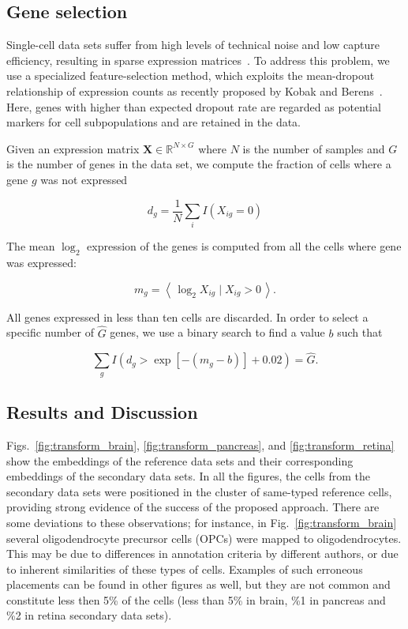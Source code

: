 \documentclass[runningheads]{llncs}
\begin{document}
\subsection{Gene selection\label{sec:gene-selection}}

Single-cell data sets suffer from high levels of technical noise and low
capture efficiency, resulting in sparse expression matrices~\cite{umi}. To
address this problem, we use a specialized feature-selection method, which
exploits the mean-dropout relationship of expression counts as recently
proposed by Kobak and Berens~\cite{art_of_using_tsne}. Here, genes with higher
than expected dropout rate are regarded as potential markers for cell
subpopulations and are retained in the data.

Given an expression matrix $\mathbf{X} \in \mathbb{R}^{N \times G}$ where $N$
is the number of samples and $G$ is the number of genes in the data set, we
compute the fraction of cells where a gene $g$ was not expressed

\begin{equation}
d_g = \frac{1}{N} \sum_i I \left ( X_{ig} = 0\right )
\end{equation}

\noindent The mean $\log_2$ expression of the genes is computed from all the
cells where gene was expressed:

\begin{equation}
m_g = \left \langle \, \log_2 X_{ig} \mid X_{ig} > 0 \, \right \rangle.
\end{equation}

All genes expressed in less than ten cells are discarded. In order to select a
specific number of $\hat{G}$ genes, we use a binary search to find a value $b$
such that

\begin{equation}
\sum_g I \left (d_g > \exp \left [ -(m_g - b) \right ] + 0.02 \right ) = \hat{G}.
\end{equation}

\subsection{Results and Discussion}
\label{sec:results}

Figs.~\ref{fig:transform_brain}, \ref{fig:transform_pancreas}, and
\ref{fig:transform_retina} show the embeddings of the reference data sets and
their corresponding embeddings of the secondary data sets. In all the figures,
the cells from the secondary data sets were positioned in the cluster of
same-typed reference cells, providing strong evidence of the success of the
proposed approach. There are some deviations to these observations; for
instance, in Fig.~\ref{fig:transform_brain} several oligodendrocyte precursor
cells (OPCs) were mapped to oligodendrocytes. This may be due to differences in
annotation criteria by different authors, or due to inherent similarities of
these types of cells. Examples of such erroneous placements can be found in
other figures as well, but they are not common and constitute less then 5\% of
the cells (less than  5\% in brain, \%1 in pancreas and \%2 in retina
secondary data sets).
\end{document}
